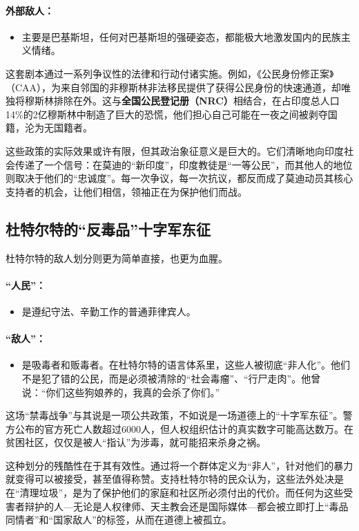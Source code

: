 \paragraph*{外部敌人：}
\begin{itemize}
\item 主要是巴基斯坦，任何对巴基斯坦的强硬姿态，都能极大地激发国内的民族主义情绪。
\end{itemize}
这套剧本通过一系列争议性的法律和行动付诸实施。例如，《公民身份修正案》（CAA），为来自邻国的非穆斯林非法移民提供了获得公民身份的快速通道，却唯独将穆斯林排除在外。这与\textbf{全国公民登记册（NRC）}相结合，在占印度总人口14\%的2亿穆斯林中制造了巨大的恐慌，他们担心自己可能在一夜之间被剥夺国籍，沦为无国籍者。

这些政策的实际效果或许有限，但其政治象征意义是巨大的。它们清晰地向印度社会传递了一个信号：在莫迪的``新印度''，印度教徒是``一等公民''，而其他人的地位则取决于他们的``忠诚度''。每一次争议，每一次抗议，都反而成了莫迪动员其核心支持者的机会，让他们相信，领袖正在为保护他们而战。

\subsection{杜特尔特的``反毒品''十字军东征}

杜特尔特的敌人划分则更为简单直接，也更为血腥。

\paragraph*{``人民''：}
\begin{itemize}
\item 是遵纪守法、辛勤工作的普通菲律宾人。
\end{itemize}

\paragraph*{``敌人''：}
\begin{itemize}
\item 是吸毒者和贩毒者。在杜特尔特的语言体系里，这些人被彻底``非人化''。他们不是犯了错的公民，而是必须被清除的``社会毒瘤''、``行尸走肉''。他曾说：``你们这些狗娘养的，我真的会杀了你们。''
\end{itemize}
这场``禁毒战争''与其说是一项公共政策，不如说是一场道德上的``十字军东征''。警方公布的官方死亡人数超过6000人，但人权组织估计的真实数字可能高达数万。在贫困社区，仅仅是被人``指认''为涉毒，就可能招来杀身之祸。

这种划分的残酷性在于其有效性。通过将一个群体定义为``非人''，针对他们的暴力就变得可以被接受，甚至值得称赞。支持杜特尔特的民众认为，这些法外处决是在``清理垃圾''，是为了保护他们的家庭和社区所必须付出的代价。而任何为这些受害者辩护的人---无论是人权律师、天主教会还是国际媒体---都会被立即打上``毒品同情者''和``国家敌人''的标签，从而在道德上被孤立。

